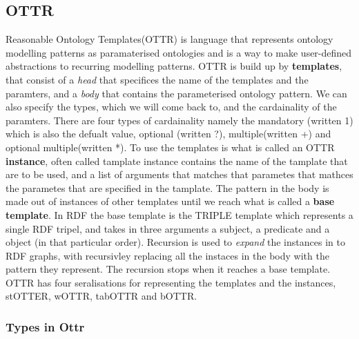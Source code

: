 \subsection{OTTR}
Reasonable Ontology Templates(OTTR) is language that represents ontology modelling patterns as paramaterised 
ontologies and is a way to make user-defined abstractions to recurring modelling patterns. 
OTTR is build up by \textbf{templates}, that consist of a \textit{head} that specifices the name of the templates
and the paramters, and a \textit{body} that contains the parameterised ontology pattern. We can also specify the types, which we will come back to, 
and the cardainality of the paramters. There are four types of cardainality namely the mandatory (written 1)
which is also the defualt value, optional (written ?), multiple(written +) and optional multiple(written *).   
To use the templates is what is called an OTTR \textbf{instance}, often called tamplate instance contains the name of the tamplate that are to be used, 
and a list of arguments that matches that parametes that mathces the parametes that are specified in the tamplate. 
The pattern in the body is made out of instances of other templates until we reach what is called a \textbf{base template}. 
In RDF the base template is the TRIPLE template which represents a single RDF tripel, and takes in three arguments a subject,
a predicate and a object (in that particular order). Recursion is used to \textit{expand} the instances in to RDF graphs, with recursivley
replacing all the instaces in the body with the pattern they represent. The recursion stops when it reaches a base template.
OTTR has four seralisations for representing the templates and the instances, stOTTER, wOTTR, tabOTTR and bOTTR.

\subsubsection{Types in Ottr}
